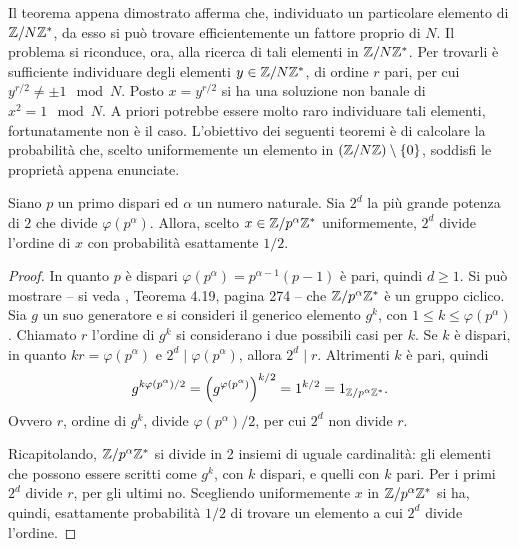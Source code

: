 Il teorema appena dimostrato afferma che, individuato un particolare elemento di $\mathbb{Z}/{N}\mathbb{Z}^*$, da esso si può trovare efficientemente un fattore proprio di $N$. 
Il problema si riconduce, ora, alla ricerca di tali elementi in $\mathbb{Z}/{N}\mathbb{Z}^*$.
Per trovarli è sufficiente individuare degli elementi $y \in \mathbb{Z}/{N}\mathbb{Z}^*$, di ordine $r$ pari, per cui $y^{r/2} \neq \pm 1 \mod N$.
Posto $x=y^{r/2}$ si ha una soluzione non banale di $x^2 = 1 \mod N$.
A priori potrebbe essere molto raro individuare tali elementi, fortunatamente non è il caso. 
L'obiettivo dei seguenti teoremi è di calcolare la probabilità che, scelto uniformemente un elemento in $\left(\mathbb{Z}/{N}\mathbb{Z}\right) \setminus \{0\}$, soddisfi le proprietà appena enunciate.

\begin{lem}\label{lem:Prob_factorization}
 Siano $p$ un primo dispari ed $\alpha$ un numero naturale.
 Sia $2^d$ la più grande potenza di $2$ che divide $\varphi\left(p^\alpha\right)$.
 Allora, scelto $x \in \mathbb{Z}/{p^\alpha}\mathbb{Z}^*$ uniformemente, $2^d$ divide l'ordine di $x$ con probabilità esattamente $1/2$.
\end{lem}
\begin{proof}
 In quanto $p$ è dispari $\varphi\left(p^\alpha\right) = p^{\alpha-1}(p-1)$ è pari, quindi $d \geq 1$.
 Si può mostrare -- si veda \cite{Book:Jacobson}, Teorema 4.19, pagina 274 -- che $\mathbb{Z}/{p^\alpha}\mathbb{Z}^*$ è un gruppo ciclico.
 Sia $g$ un suo generatore e si consideri il generico elemento $g^k$, con $1 \leq k \leq \varphi\left(p^\alpha\right)$.
 Chiamato $r$ l'ordine di $g^k$ si considerano i due possibili casi per $k$.
 Se $k$ è dispari, in quanto $kr = \varphi\left(p^\alpha\right)$ e $2^d \mid \varphi\left(p^\alpha\right)$, allora $2^d \mid r$.
 Altrimenti $k$ è pari, quindi
 \begin{equation}
  g^{k\varphi\left(p^\alpha\right)/2} = \left(g^{\varphi\left(p^\alpha\right)}\right)^{k/2} = 1^{k/2} = 1_{\mathbb{Z}/{p^\alpha}\mathbb{Z}^*}.
 \end{equation}
 Ovvero $r$, ordine di $g^k$, divide $\varphi\left(p^\alpha\right)/2$, per cui $2^d$ non divide $r$.
 
 Ricapitolando, $\mathbb{Z}/{p^\alpha}\mathbb{Z}^*$ si divide in 2 insiemi di uguale cardinalità: gli elementi che possono essere scritti come $g^k$, con $k$ dispari, e quelli con $k$ pari. 
 Per i primi $2^d$ divide $r$, per gli ultimi no.
 Scegliendo uniformemente $x$ in $\mathbb{Z}/{p^\alpha}\mathbb{Z}^*$ si ha, quindi, esattamente probabilità $1/2$ di trovare un elemento a cui $2^d$ divide l'ordine.
\end{proof}

